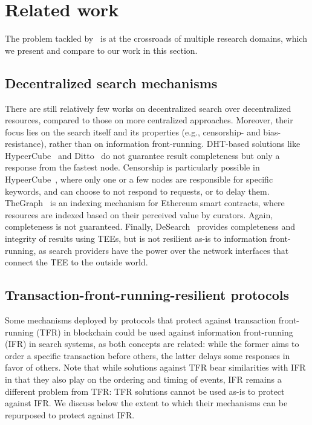 \section{Related work}\label{sec:related_work}

The problem tackled by \sysname~is at the crossroads of multiple research domains, which we present and compare to our work in this section.

\subsection{Decentralized search mechanisms}

There are still relatively few works on decentralized search over decentralized resources, compared to those on more centralized approaches.
Moreover, their focus lies on the search itself and its properties (e.g., censorship- and bias-resistance), rather than on information front-running.
DHT-based solutions like HypeerCube~\cite{zichichi_towards_2021} and Ditto~\cite{keizerDittoDecentralisedSimilarity2023} do not guarantee result completeness but only a response from the fastest node. 
Censorship is particularly possible in HypeerCube~\cite{zichichi_towards_2021}, where only one or a few nodes are responsible for specific keywords, and can choose to not respond to requests, or to delay them.
TheGraph~\cite{Graph} is an indexing mechanism for Ethereum smart contracts, where resources are indexed based on their perceived value by curators. 
Again, completeness is not guaranteed.
Finally, DeSearch~\cite{liBringingDecentralizedSearch2021} provides completeness and integrity of results using TEEs, but is not resilient as-is to information front-running, as search providers have the power over the network interfaces that connect the TEE to the outside world.

\subsection{Transaction-front-running-resilient protocols}

Some mechanisms deployed by protocols that protect against transaction front-running (TFR) in blockchain could be used against information front-running (IFR) in search systems, as both concepts are related: 
while the former aims to order a specific transaction before others, the latter delays some responses in favor of others.
Note that while solutions against TFR bear similarities with IFR in that they also play on the ordering and timing of events, IFR remains a different problem from TFR: TFR solutions cannot be used as-is to protect against IFR. 
We discuss below the extent to which their mechanisms can be repurposed to protect against IFR.

